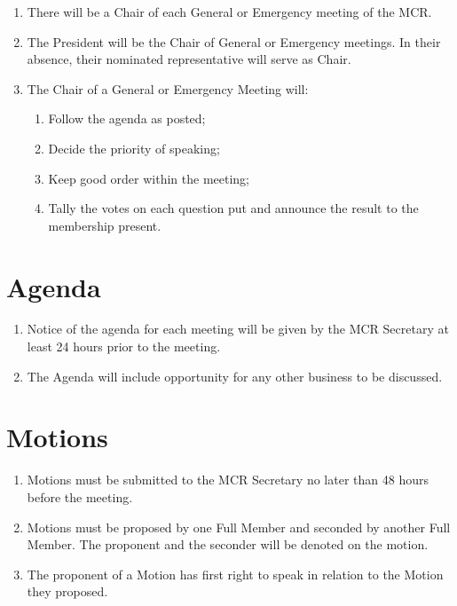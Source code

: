\documentclass[11pt, a4paper]{article}
\begin{document}
\begin{enumerate}
    \item There will be a Chair of each General or Emergency meeting of the MCR.
    \item The President will be the Chair of General or Emergency meetings. In their absence, their nominated representative will serve as Chair.
    \item The Chair of a General or Emergency Meeting will:
    \begin{enumerate}
        \item Follow the agenda as posted;
        \item Decide the priority of speaking;
        \item Keep good order within the meeting;
        \item Tally the votes on each question put and announce the result to the membership present.
    \end{enumerate}
\end{enumerate}





\section{Agenda}
\label{sec:agenda}

\begin{enumerate}
    \item Notice of the agenda for each meeting will be given by the MCR Secretary at least 24 hours prior to the meeting.
    \item The Agenda will include opportunity for any other business to be discussed.
\end{enumerate}





\section{Motions}
\label{sec:motions}

\begin{enumerate}
    \item Motions must be submitted to the MCR Secretary no later than 48 hours before the meeting.
    \item Motions must be proposed by one Full Member and seconded by another Full Member. The proponent and the seconder will be denoted on the motion.
    \item The proponent of a Motion has first right to speak in relation to the Motion they proposed.
\end{enumerate}
\end{document}

